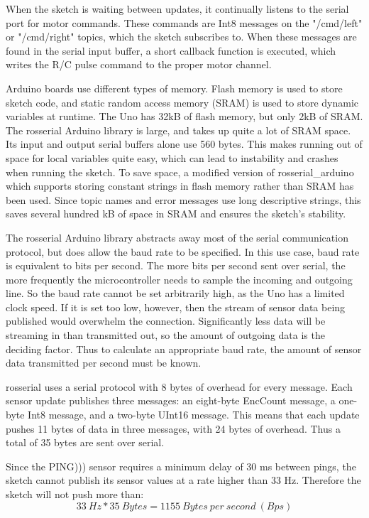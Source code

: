 When the sketch is waiting between updates, it continually listens to the serial port for motor commands. These commands are Int8 messages on the "/cmd/left" or "/cmd/right" topics, which the sketch subscribes to. When these messages are found in the serial input buffer, a short callback function is executed, which writes the R/C pulse command to the proper motor channel.

Arduino boards use different types of memory. Flash memory is used to store sketch code, and static random access memory (SRAM) is used to store dynamic variables at runtime. The Uno has 32kB of flash memory, but only 2kB of SRAM. The rosserial Arduino library is large, and takes up quite a lot of SRAM space. Its input and output serial buffers alone use 560 bytes. This makes running out of space for local variables quite easy, which can lead to instability and crashes when running the sketch. To save space, a modified version of rosserial\_arduino which supports storing constant strings in flash memory rather than SRAM has been used. Since topic names and error messages use long descriptive strings, this saves several hundred kB of space in SRAM and ensures the sketch's stability.

The rosserial Arduino library abstracts away most of the serial communication protocol, but does allow the baud rate to be specified. In this use case, baud rate is equivalent to bits per second. The more bits per second sent over serial, the more frequently the microcontroller needs to sample the incoming and outgoing line. So the baud rate cannot be set arbitrarily high, as the Uno has a limited clock speed. If it is set too low, however, then the stream of sensor data being published would overwhelm the connection. Significantly less data will be streaming in than transmitted out, so the amount of outgoing data is the deciding factor. Thus to calculate an appropriate baud rate, the amount of sensor data transmitted per second must be known.

rosserial uses a serial protocol with 8 bytes of overhead for every message. Each sensor update publishes three messages: an eight-byte EncCount message, a one-byte Int8 message, and a two-byte UInt16 message. This means that each update pushes 11 bytes of data in three messages, with 24 bytes of overhead. Thus a total of 35 bytes are sent over serial.

Since the PING))) sensor requires a minimum delay of 30 ms between pings, the sketch cannot publish its sensor values at a rate higher than 33 Hz. Therefore the sketch will not push more than:
\[33\ Hz * 35\ Bytes = 1155\ Bytes\ per\ second\ (Bps)\]

